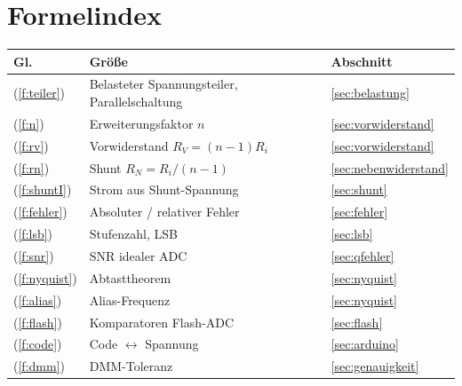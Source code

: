 \documentclass[11pt,a4paper]{article}
\begin{document}
\section{Formelindex}\label{sec:formeln}
\begin{tabularx}{\textwidth}{@{}lXl@{}}
\toprule
Gl. & Größe & Abschnitt\\ \midrule
(\ref{f:teiler}) & Belasteter Spannungsteiler, Parallelschaltung & \ref{sec:belastung}\\
(\ref{f:n}) & Erweiterungsfaktor $n$ & \ref{sec:vorwiderstand}\\
(\ref{f:rv}) & Vorwiderstand $R_V=(n-1)R_i$ & \ref{sec:vorwiderstand}\\
(\ref{f:rn}) & Shunt $R_N=R_i/(n-1)$ & \ref{sec:nebenwiderstand}\\
(\ref{f:shuntI}) & Strom aus Shunt-Spannung & \ref{sec:shunt}\\
(\ref{f:fehler}) & Absoluter / relativer Fehler & \ref{sec:fehler}\\
(\ref{f:lsb}) & Stufenzahl, LSB & \ref{sec:lsb}\\
(\ref{f:snr}) & SNR idealer ADC & \ref{sec:qfehler}\\
(\ref{f:nyquist}) & Abtasttheorem & \ref{sec:nyquist}\\
(\ref{f:alias}) & Alias-Frequenz & \ref{sec:nyquist}\\
(\ref{f:flash}) & Komparatoren Flash-ADC & \ref{sec:flash}\\
(\ref{f:code}) & Code $\leftrightarrow$ Spannung & \ref{sec:arduino}\\
(\ref{f:dmm}) & DMM-Toleranz & \ref{sec:genauigkeit}\\
\bottomrule
\end{tabularx}

\end{document}
